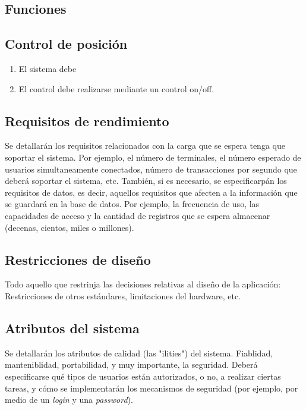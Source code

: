 \documentclass[12pt,a4paper, twosite]{article}
\begin{document}
	\subsection{Funciones}
	\label{sec:org307bb59}
	\subsection{Control de posición}
	\begin{enumerate}
		\item El sistema debe   
		\item El control debe realizarse mediante un control on/off. 
	\end{enumerate}
	
	
	
	
	\subsection{Requisitos de rendimiento}
	\label{sec:org94bc543}
	
	Se detallarán los requisitos relacionados con la carga que se espera
	tenga que soportar el sistema. Por ejemplo, el número de terminales,
	el número esperado de usuarios simultaneamente conectados, número de
	transacciones por segundo que deberá soportar el sistema, etc.
	También, si es necesario, se especificarpán los requisitos de
	datos, es decir, aquellos requisitos que afecten a la información
	que se guardará en la base de datos. Por ejemplo, la frecuencia de
	uso, las capacidades de acceso y la cantidad de registros que se
	espera almacenar (decenas, cientos, miles o millones).
	
	
	\subsection{Restricciones de diseño}
	\label{sec:org49fe900}
	
	
	Todo aquello que restrinja las decisiones relativas al diseño de la
	aplicación: Restricciones de otros estándares, limitaciones del
	hardware, etc.
	
	
	\subsection{Atributos del sistema}
	\label{sec:orgd0babc0}
	
	Se detallarán los atributos de calidad (las "ilities") del
	sistema. Fiablidad, manteniblidad, portabilidad, y muy importante,
	la seguridad. Deberá especificarse qué tipos de usuarios están
	autorizados, o no, a realizar ciertas tareas, y cómo se
	implementarán los mecanismos de seguridad (por ejemplo, por medio de
	un \emph{login} y una \emph{password}).
	
\end{document}
